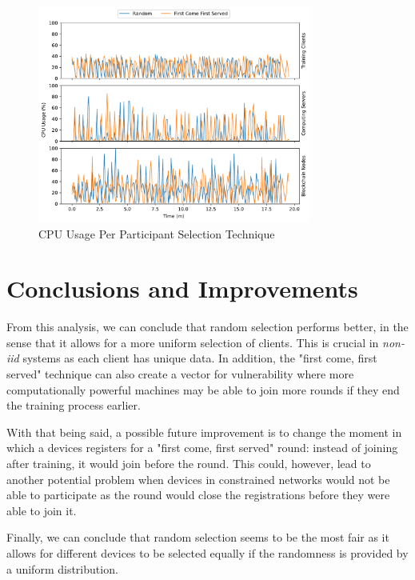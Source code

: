 \begin{figure}[!hpb]
    \centering
    \centering
    \includegraphics[width=0.8\textwidth]{graphics/selection/cpu.pdf}
    \caption{CPU Usage Per Participant Selection Technique}
    \label{fig:cpu_selection}
\end{figure}

\section{Conclusions and Improvements}

From this analysis, we can conclude that random selection performs better, in the sense that it allows for a more uniform selection of clients. This is crucial in \textit{non-iid} systems as each client has unique data. In addition, the "first come, first served" technique can also create a vector for vulnerability where more computationally powerful machines may be able to join more rounds if they end the training process earlier.

With that being said, a possible future improvement is to change the moment in which a devices registers for a "first come, first served" round: instead of joining after training, it would join before the round. This could, however, lead to another potential problem when devices in constrained networks would not be able to participate as the round would close the registrations before they were able to join it.

Finally, we can conclude that random selection seems to be the most fair as it allows for different devices to be selected equally if the randomness is provided by a uniform distribution.